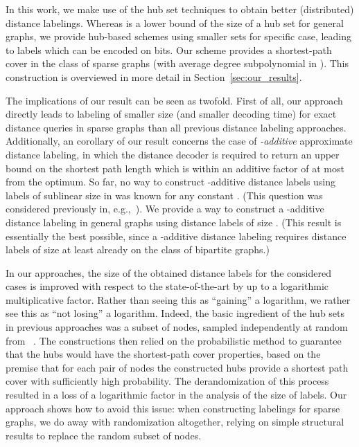 \documentclass{article}[11pt,letter]
\begin{document}
In this work, we make use of the hub set techniques to obtain better (distributed) distance labelings. Whereas  is a lower bound of the size of a hub set for general graphs, we provide hub-based schemes using smaller sets for specific case, leading to labels which can be encoded on  bits. Our scheme provides a shortest-path cover in the class of sparse graphs (with average degree  subpolynomial in ). This construction is overviewed in more detail in Section~\ref{sec:our_results}.

The implications of our result can be seen as twofold. First of all, our approach directly leads to labeling of smaller size (and smaller decoding time) for exact distance queries in sparse graphs than all previous distance labeling approaches. Additionally, an corollary of our result concerns the case of \emph{-additive} approximate distance labeling, in which the distance decoder is required to return an upper bound on the shortest path length which is within an additive factor of at most  from the optimum. So far, no way to construct -additive distance labels using labels of sublinear size in  was known for any constant . (This question was considered previously in, e.g.,~\cite{DBLP:conf/soda/AlstrupGHP16}). We provide a way to construct a -additive distance labeling in general graphs using distance labels of size . (This result is essentially the best possible, since a -additive distance labeling requires distance labels of size at least  already on the class of bipartite graphs.)

In our approaches, the size of the obtained distance labels for the considered cases is improved with respect to the state-of-the-art by up to a logarithmic multiplicative factor. Rather than seeing this as ``gaining'' a logarithm, we rather see this as ``not losing'' a logarithm. Indeed, the basic ingredient of the hub sets in previous approaches was a subset of nodes, sampled independently at random from ~\cite{BCE05,Sublinear}. The constructions then relied on the probabilistic method to guarantee that the hubs would have the shortest-path cover properties, based on the premise that for each pair of nodes the constructed hubs provide a shortest path cover with sufficiently high probability. The derandomization of this process resulted in a loss of a logarithmic factor in the analysis of the size of labels. Our approach shows how to avoid this issue: when constructing labelings for sparse graphs, we do away with randomization altogether, relying on simple structural results to replace the random subset of nodes.
\end{document}
